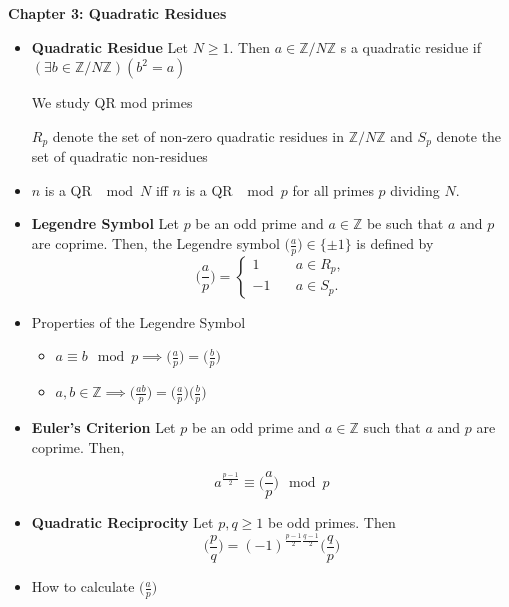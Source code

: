 \documentclass[a4paper, 12pt]
{article}
\newcommand{\zn}{\mathbb{Z}/ N\mathbb{Z}}
\newcommand{\ls}[2]{\bigg(\frac{#1}{#2}\bigg)}
\begin{document}
\hfill 

\textbf{Chapter 3: Quadratic Residues}
\begin{itemize}
	\item \textbf{Quadratic Residue} Let $N \geq 1.$ Then $a \in \zn$ s a quadratic residue if $(\exists b \in \zn)(b^2 =a)$
	
	We study QR mod primes
	
	$R_p$ denote the set of non-zero quadratic residues in $\zn$ and $S_p$ denote the set of quadratic non-residues
	
	\item $n$ is a QR $\mod N$ iff $n$ is a QR $\mod p$ for all primes $p$ dividing $N.$
	
	\item \textbf{Legendre Symbol} Let $p$ be an odd prime and $a \in \mathbb{Z}$ be such that $a$ and $p$ are coprime. Then, the Legendre symbol $\ls{a}{p} \in \{\pm 1\}$ is defined by 
\begin{equation*}
	\ls{a}{p} = \begin{cases}
		1 & \quad a \in R_p, \\
		-1 & \quad a \in S_p.
	\end{cases}
	\end{equation*}
	
	\hfill
	
	\item Properties of the Legendre Symbol
	\begin{itemize}
		\item $a \equiv b \mod p \implies \ls{a}{p} = \ls{b}{p}$
		\item $a,b \in \mathbb{Z} \implies \ls{ab}{p} =\ls{a}{p} \ls{b}{p}$
	\end{itemize}
	
	
	\item \textbf{Euler's Criterion} Let $p$ be an odd prime and $a \in \mathbb{Z}$ such that $a$ and $p$ are coprime. Then,
	
	\begin{equation*}
		a^\frac{p-1}{2} \equiv \ls{a}{p}\mod p
	\end{equation*}
	
	\item \textbf{Quadratic Reciprocity} Let $p,q \geq 1$ be odd primes. Then 
	$$\ls{p}{q}= (-1)^{\frac{p-1}{2}\frac{q-1}{2}}\ls{q}{p}$$
	
	\newpage
	
		\item How to calculate  $\ls{a}{p}$
	

\end{itemize}
\end{document}
